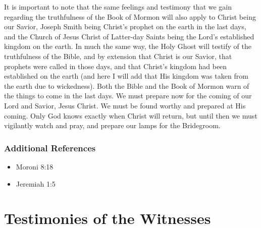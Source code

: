 \documentclass[12pt]{report}
\begin{document}
It is important to note that the same feelings and testimony that we gain regarding the truthfulness of the Book of Mormon will also apply to Christ being our Savior, Joseph Smith being Christ's prophet on the earth in the last days, and the Church of Jesus Christ of Latter-day Saints being the Lord's established kingdom on the earth.  In much the same way, the Holy Ghost will testify of the truthfulness of the Bible, and by extension that Christ is our Savior, that prophets were called in those days, and that Christ's kingdom had been established on the earth (and here I will add that His kingdom was taken from the earth due to wickedness).  Both the Bible and the Book of Mormon warn of the things to come in the last days.  We must prepare now for the coming of our Lord and Savior, Jesus Christ.  We must be found worthy and prepared at His coming.  Only God knows exactly when Christ will return, but until then we must vigilantly watch and pray, and prepare our lamps for the Bridegroom.

\subsection{Additional References\label{intro:references9}}
\begin{itemize}
\item Moroni 8:18
\item Jeremiah 1:5
\end{itemize}

\chapter{Testimonies of the Witnesses}
\end{document}
